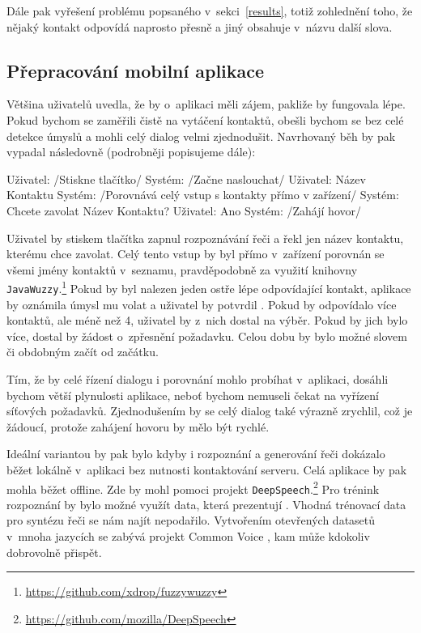 Dále pak vyřešení problému popsaného v~sekci~\ref{results}, totiž zohlednění
toho, že nějaký kontakt odpovídá naprosto
přesně a jiný obsahuje v~názvu další slova.

\subsection{Přepracování mobilní aplikace}\label{better-app}

Většina uživatelů uvedla, že by o~aplikaci měli zájem, pakliže by fungovala
lépe. Pokud bychom se zaměřili čistě na vytáčení kontaktů, obešli bychom se
bez celé detekce úmyslů a mohli celý dialog velmi zjednodušit.
Navrhovaný běh by pak vypadal následovně (podrobněji popisujeme dále):
\begin{code}
    Uživatel: /Stiskne tlačítko/
    Systém:   /Začne naslouchat/
    Uživatel: Název Kontaktu
    Systém:   /Porovnává celý vstup s kontakty přímo v zařízení/
    Systém:   Chcete zavolat Název Kontaktu?
    Uživatel: Ano
    Systém:   /Zahájí hovor/
\end{code}
Uživatel by stiskem
tlačítka zapnul rozpoznávání řeči a řekl jen název kontaktu,
kterému chce zavolat. Celý tento vstup by byl přímo v~zařízení
porovnán se všemi jmény kontaktů v~seznamu, pravděpodobně za
využití knihovny \texttt{JavaWuzzy}.\footnote{\url{https://github.com/xdrop/fuzzywuzzy}} Pokud by byl
nalezen jeden ostře lépe odpovídající kontakt, aplikace
by oznámila úmysl mu volat a uživatel by potvrdil .
Pokud by odpovídalo více kontaktů, ale méně než 4, uživatel
by z~nich dostal na výběr. Pokud by jich bylo více, dostal by
žádost o~zpřesnění požadavku. Celou dobu by bylo možné slovem
 či obdobným začít od začátku.

Tím, že by celé řízení dialogu i porovnání mohlo probíhat v~aplikaci,
dosáhli bychom větší plynulosti aplikace, neboť bychom nemuseli čekat
na vyřízení síťových požadavků. Zjednodušením by se celý dialog také
výrazně zrychlil, což je žádoucí, protože zahájení hovoru by mělo
být rychlé.

Ideální variantou by pak bylo kdyby i rozpoznání a generování řeči
dokázalo běžet lokálně v~aplikaci bez nutnosti kontaktování serveru.
Celá aplikace by pak mohla běžet offline. Zde by mohl pomoci projekt
\texttt{DeepSpeech}.\footnote{\url{https://github.com/mozilla/DeepSpeech}}
Pro trénink rozpoznání by bylo možné využít data, která prezentují \citet{kratochvil-etal-2020-large}.
Vhodná trénovací data pro syntézu řeči se nám najít nepodařilo. Vytvořením
otevřených datasetů v~mnoha jazycích se zabývá projekt Common Voice \citep{commonvoice_2020},
kam může kdokoliv dobrovolně přispět.